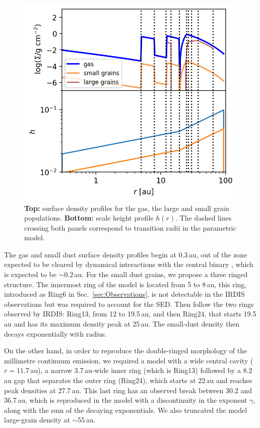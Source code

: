 \documentclass[letters,usenatbib,times]{mnras}
\begin{document}
\begin{figure}
	\includegraphics[width=\columnwidth]{allprofiles.png}
        \caption{{\bf Top:} surface density profiles for the gas, the large and small grain populations. {\bf Bottom:} scale height profile $h(r)$. The dashed lines crossing both panels correspond to transition radii in the parametric model.}
    \label{fig:profiles}
\end{figure}

The gas and small dust surface density profiles begin at 0.3\,au, out of the zone expected to be cleared by dynamical interactions with the central binary \citep{Art_Lu}, which is expected to be $\sim$0.2\,au. For the small dust grains, we propose a three ringed structure. The innermost ring of the model is located from 5 to 8\,au, this ring, introduced as Ring6 in Sec.~\ref{sec:Observations}, is not detectable in the IRDIS observations but was required to account for the SED. Then follow the two rings observed by IRDIS: Ring13, from 12 to 19.5\,au, %
and then Ring24, that starts 19.5\,au and has its maximum density peak at 25\,au. The small-dust density then decays exponentially with radius.

On the other hand, in order to reproduce the double-ringed morphology of the millimetre continuum emission, we required a model with a wide central cavity ($r = 11.7$\,au), a narrow 3.7\,au-wide inner ring (which is Ring13) followed by a 8.2\,au gap that separates the outer ring (Ring24), which starts at 22\,au and reaches peak densities at 27.7\,au. This last ring has an observed break between 30.2 and 36.7\,au, which is reproduced in the model with a discontinuity in the exponent $\gamma$, along with the sum of the decaying exponentials. We also truncated the model large-grain density at $\sim$55\,au. 
\end{document}
